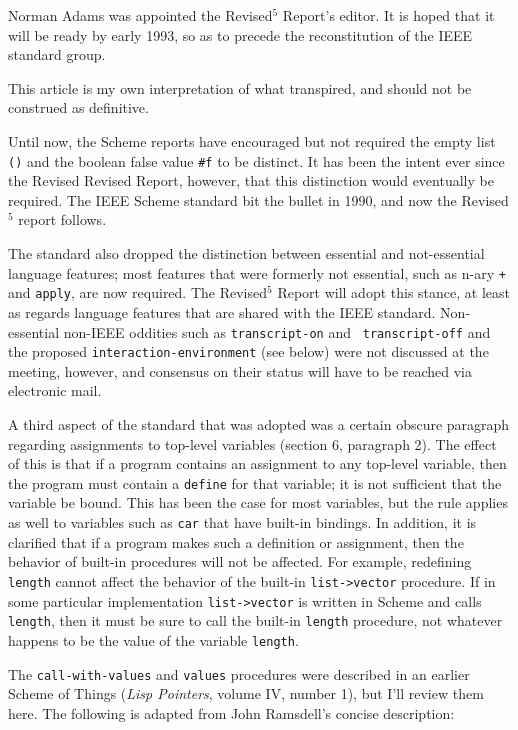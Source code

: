 Norman Adams was appointed the Revised$^5$ Report's editor.  It is
hoped that it will be ready by early 1993, so as to precede the
reconstitution of the IEEE standard group.

This article is my own interpretation of what transpired, and should
not be construed as definitive.



Until now, the Scheme reports have encouraged but not required the
empty list {\tt()} and the boolean false value {\tt\#f} to be
distinct.  It has been the intent ever since the Revised Revised
Report, however, that this distinction would eventually be required.
The IEEE Scheme standard bit the bullet in 1990, and now the
Revised$^5$ report follows.

The standard also dropped the distinction between essential and
not-essential language features; most features that were formerly not
essential, such as n-ary {\tt+} and {\tt apply}, are now required.
The Revised$^5$ Report will adopt this stance, at least as regards
language features that are shared with the IEEE standard.
Non-essential non-IEEE oddities such as {\tt transcript-on} and {\tt
transcript-off} and the proposed {\tt interaction-environment} (see
below) were not discussed at the meeting, however, and consensus on
their status will have to be reached via electronic mail.

A third aspect of the standard that was adopted was a certain obscure
paragraph regarding assignments to top-level variables (section 6,
paragraph 2).  The effect of this is that if a program contains an
assignment to any top-level variable, then the program must contain a
{\tt define} for that variable; it is not sufficient that the variable
be bound.  This has been the case for most variables, but the rule
applies as well to variables such as {\tt car} that have built-in
bindings.  In addition, it is clarified that if a program makes such a
definition or assignment, then the behavior of built-in procedures
will not be affected.  For example, redefining {\tt length} cannot
affect the behavior of the built-in {\tt list->vector} procedure.
If in some particular implementation {\tt list->vector} is written
in Scheme and calls {\tt length}, then it must be sure to call the
built-in {\tt length} procedure, not whatever happens to be the value
of the variable {\tt length}.



The {\tt call-with-values} and {\tt values} procedures were described
in an earlier Scheme of Things ({\em Lisp Pointers}, volume IV, number
1), but I'll review them here.  The following is adapted from John Ramsdell's
concise description:

